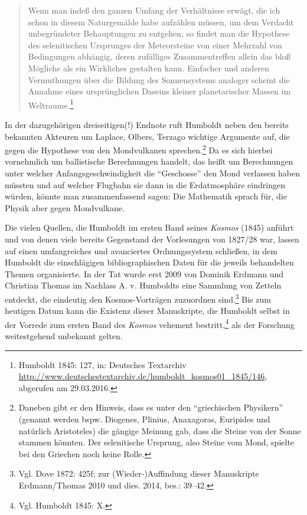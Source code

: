 \documentclass[output=paper]{langsci/langscibook}
\begin{document}
\begin{quote}
Wenn man indeß den ganzen Umfang der Verhältnisse erwägt, die ich schon
in diesem Naturgemälde habe aufzählen müssen, um dem Verdacht
unbegründeter Behauptungen zu entgehen, so findet man die Hypothese des
selenitischen Ursprunges der Meteorsteine von einer Mehrzahl von
Bedingungen abhängig, deren zufälliges Zusammentreffen allein das bloß
Mögliche als ein Wirkliches gestalten kann. Einfacher und anderen
Vermuthungen über die Bildung des Sonnensystems analoger scheint die
Annahme eines ursprünglichen Daseins kleiner planetarischer Massen im
Weltraume.\footnote{Humboldt 1845: 127, in: Deutsches Textarchiv
  \url{http://www.deutschestextarchiv.de/humboldt_kosmos01_1845/146},
  abgerufen am 29.03.2016.}
\end{quote}

In der dazugehörigen dreiseitigen(!) Endnote ruft Humboldt neben den
bereits bekannten Akteuren um Laplace, Olbers, Terzago wichtige
Argumente auf, die gegen die Hypothese von den Mondvulkanen
sprechen.\footnote{Daneben gibt er den Hinweis, dass es unter den
  \enquote{griechischen Physikern} (genannt werden bspw. Diogenes,
  Plinius, Anaxagoras, Euripides und natürlich Aristoteles) die gängige
  Meinung gab, dass die Steine von der Sonne stammen könnten. Der
  selenitische Ursprung, also Steine vom Mond, spielte bei den Griechen
  noch keine Rolle.} Da es sich hierbei vornehmlich um ballistische
Berechnungen handelt, das heißt um Berechnungen unter welcher
Anfangsgeschwindigkeit die \enquote{Geschosse} den Mond verlassen haben
müssten und auf welcher Flugbahn sie dann in die Erdatmosphäre
eindringen würden, könnte man zusammenfassend sagen: Die Mathematik
sprach für, die Physik aber gegen Mondvulkane.

Die vielen Quellen, die Humboldt im ersten Band seines \emph{Kosmos}
(1845) anführt und von denen viele bereits Gegenstand der Vorlesungen
von 1827/28 war, lassen auf einen umfangreiches und avanciertes
Ordnungssystem schließen, in dem Humboldt die einschlägigen
bibliographischen Daten für die jeweils behandelten Themen organisierte.
In der Tat wurde erst 2009 von Dominik Erdmann und Christian Thomas im
Nachlass A. v. Humboldts eine Sammlung von Zetteln entdeckt, die
eindeutig den Kosmos-Vorträgen zuzuordnen sind.\footnote{Vgl. Dove 1872:
  425f; zur (Wieder-)Auffindung dieser Manuskripte Erdmann/Thomas 2010
  und dies. 2014, bes.: 39--42.} Bis zum heutigen Datum kann die
Existenz dieser Manuskripte, die Humboldt selbst in der Vorrede zum
ersten Band des \emph{Kosmos} vehement bestritt,\footnote{Vgl. Humboldt
  1845: X.} als der Forschung weitestgehend unbekannt gelten.
\end{document}
